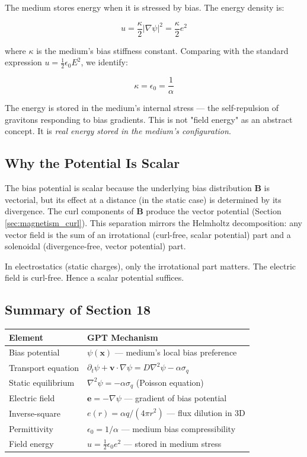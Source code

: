\documentclass[12pt, a4paper]{article}
\begin{document}
The medium stores energy when it is stressed by bias. The energy density is:

\[
u = \frac{\kappa}{2} |\nabla \psi|^2 = \frac{\kappa}{2} e^2
\]

where \( \kappa \) is the medium's bias stiffness constant. Comparing with the standard expression \( u = \frac{1}{2} \epsilon_0 E^2 \), we identify:

\[
\kappa = \epsilon_0 = \frac{1}{\alpha}
\]

The energy is stored in the medium's internal stress — the self-repulsion of gravitons responding to bias gradients. This is not "field energy" as an abstract concept. It is \textit{real energy stored in the medium's configuration}.

\subsection{Why the Potential Is Scalar}
\label{subsec:why_scalar}

The bias potential is scalar because the underlying bias distribution \( \mathbf{B} \) is vectorial, but its effect at a distance (in the static case) is determined by its divergence. The curl components of \( \mathbf{B} \) produce the vector potential (Section \ref{sec:magnetism_curl}). This separation mirrors the Helmholtz decomposition: any vector field is the sum of an irrotational (curl-free, scalar potential) part and a solenoidal (divergence-free, vector potential) part.

In electrostatics (static charges), only the irrotational part matters. The electric field is curl-free. Hence a scalar potential suffices.

\subsection{Summary of Section 18}
\label{subsec:summary_18}

\begin{center}
\begin{tabular}{|p{4cm}|p{10cm}|}
\hline
\textbf{Element} & \textbf{GPT Mechanism} \\
\hline
Bias potential & \( \psi(\mathbf{x}) \) — medium's local bias preference \\
\hline
Transport equation & \( \partial_t \psi + \mathbf{v} \cdot \nabla \psi = D \nabla^2 \psi - \alpha \sigma_q \) \\
\hline
Static equilibrium & \( \nabla^2 \psi = -\alpha \sigma_q \) (Poisson equation) \\
\hline
Electric field & \( \mathbf{e} = -\nabla \psi \) — gradient of bias potential \\
\hline
Inverse-square & \( e(r) = \alpha q/(4\pi r^2) \) — flux dilution in 3D \\
\hline
Permittivity & \( \epsilon_0 = 1/\alpha \) — medium bias compressibility \\
\hline
Field energy & \( u = \frac{1}{2} \epsilon_0 e^2 \) — stored in medium stress \\
\hline
\end{tabular}
\end{center}
\end{document}
